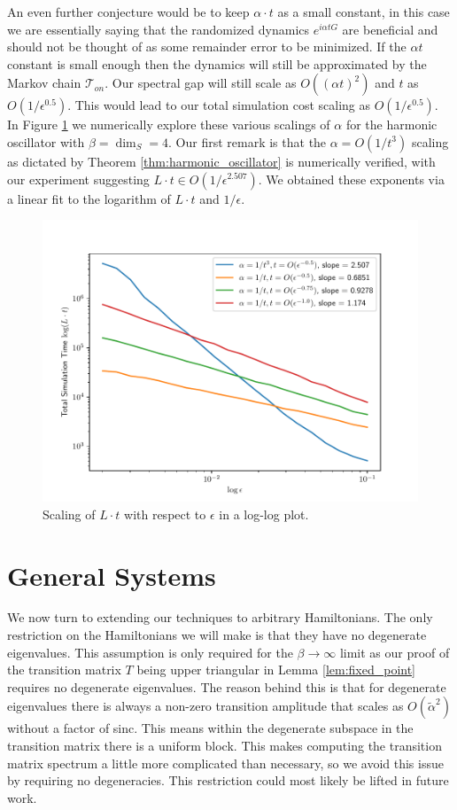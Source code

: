 \documentclass{article}
\newcommand{\TT}{\mathcal{T}}
\newcommand{\bigo}[1]{O\left(#1\right)}
\begin{document}
An even further conjecture would be to keep $\alpha \cdot t$ as a small constant, in this case we are essentially saying that the randomized dynamics $e^{i \alpha t G}$ are beneficial and should not be thought of as some remainder error to be minimized. If the $\alpha t$ constant is small enough then the dynamics will still be approximated by the Markov chain $\TT_{on}$. Our spectral gap will still scale as $\bigo{(\alpha t)^2}$ and $t$ as $\bigo{1/\epsilon^{0.5}}$. This would lead to our total simulation cost scaling as $\bigo{1/\epsilon^{0.5}}$. In Figure \ref{fig:epsilon_scaling} we numerically explore these various scalings of $\alpha$ for the harmonic oscillator with $\beta = \dim_S = 4$. Our first remark is that the $\alpha = \bigo{1/t^3}$ scaling as dictated by Theorem \ref{thm:harmonic_oscillator} is numerically verified, with our experiment suggesting $L \cdot t \in \bigo{1/\epsilon^{2.507}}$. We obtained these exponents via a linear fit to the logarithm of $L\cdot t$ and $1/\epsilon$.



\begin{figure}
    \centering
    \includegraphics[width=0.5\linewidth]{numerics/data/epsilon_fitting_plot_3.pdf}
    \caption{Scaling of $L \cdot t$ with respect to $\epsilon$ in a log-log plot.}
    \label{fig:epsilon_scaling}
\end{figure}


\section{General Systems} \label{sec:general_systems}

We now turn to extending our techniques to arbitrary Hamiltonians. The only restriction on the Hamiltonians we will make is that they have no degenerate eigenvalues. This assumption is only required for the $\beta \to \infty$ limit as our proof of the transition matrix $T$ being upper triangular in Lemma \ref{lem:fixed_point} requires no degenerate eigenvalues. The reason behind this is that for degenerate eigenvalues there is always a non-zero transition amplitude that scales as $\bigo{\widetilde{\alpha}^2}$ without a factor of sinc. This means within the degenerate subspace in the transition matrix there is a uniform block. This makes computing the transition matrix spectrum a little more complicated than necessary, so we avoid this issue by requiring no degeneracies. This restriction could most likely be lifted in future work. 
\end{document}
